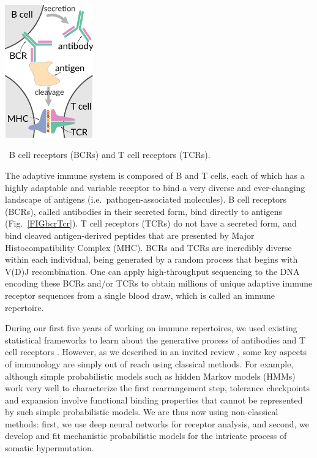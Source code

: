 \documentclass[nobib]{tufte-handout}
\begin{document}
\begin{marginfigure}[0.5in]%
\begin{centering}
  \includegraphics[width=1.5in]{bcr-tcr}
\end{centering}
  \caption{\
    B cell receptors (BCRs) and T cell receptors (TCRs).
    }
  \label{FIGbcrTcr}
\end{marginfigure}%

The adaptive immune system is composed of B and T cells, each of which has a highly adaptable and variable receptor to bind a very diverse and ever-changing landscape of antigens (i.e.\ pathogen-associated molecules).
B cell receptors (BCRs), called antibodies in their secreted form, bind directly to antigens (Fig.~\ref{FIGbcrTcr}).
T cell receptors (TCRs) do not have a secreted form, and bind cleaved antigen-derived peptides that are presented by Major Histocompatibility Complex (MHC).
BCRs and TCRs are incredibly diverse within each individual, being generated by a random process that begins with V(D)J recombination.
One can apply high-throughput sequencing to the DNA encoding these BCRs and/or TCRs to obtain millions of unique adaptive immune receptor sequences from a single blood draw, which is called an immune repertoire.

During our first five years of working on immune repertoires, we used existing statistical frameworks to learn about the generative process of antibodies and T cell receptors \cite{McCoy2015-qi, Ralph2016-kr, Ralph2016-yl, Ralph2017-ih, DeWitt2018-el, Dhar2018-ne, Zhang2018-gn, Davidsen2018-gn, DeWitt2018-ar, Simonich2019-nn, Feng2019-sj, Dhar2019-qg}.
However, as we described in an invited review \cite{Olson2018-lw}, some key aspects of immunology are simply out of reach using classical methods.
For example, although simple probabilistic models such as hidden Markov models (HMMs) work very well to characterize the first rearrangement step, tolerance checkpoints and expansion involve functional binding properties that cannot be represented by such simple probabilistic models.
We are thus now using non-classical methods:
first, we use deep neural networks for receptor analysis, and second, we develop and fit mechanistic probabilistic models for the intricate process of somatic hypermutation.
\end{document}
